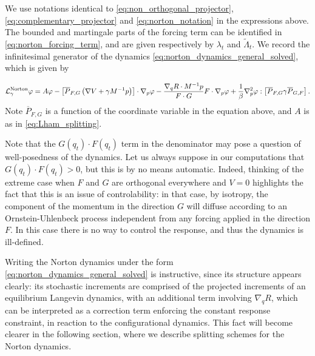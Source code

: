 We use notations identical to \eqref{eq:non_orthogonal_projector}, \eqref{eq:complementary_projector} and \eqref{eq:norton_notation} in the expressions above. The bounded and martingale parts of the forcing term can be identified in \eqref{eq:norton_forcing_term}, and are given respectively by $\lambda_t$ and $\widetilde{\Lambda}_t$. 
We record the infinitesimal generator of the dynamics \eqref{eq:norton_dynamics_general_solved}, which is given by

\begin{equation}
    \label{eq:norton_general_generator}
    \mathcal{L}_{\gamma}^{\mathrm{Norton}}\varphi = A \varphi - \left[\overline{P}_{F,G}\left(\nabla V+\gamma M^{-1}p\right)\right] \cdot \nabla_p\varphi - \frac{\nabla_q R \cdot M^{-1}p}{F\cdot G} F\cdot \nabla_p \varphi + \frac1\beta\nabla^2_p\varphi : \left[\overline{P}_{F,G}\gamma\overline{P}_{G,F}\right].
\end{equation}
Note $\overline{P}_{F,G}$ is a function of the coordinate variable in the equation above, and $A$ is as in \eqref{eq:Lham_splitting}.
\begin{remark}
    \label{rem:norton_sv_well_posedness}
    Note that the $G(q_t)\cdot F(q_t)$ term in the denominator may pose a question of well-posedness of the dynamics. Let us always suppose in our computations that $G(q_t)\cdot F(q_t)>0$, but this is by no means automatic.
    Indeed, thinking of the extreme case when $F$ and $G$ are orthogonal everywhere and $V=0$ highlights the fact that this is an issue of controlability: in that case, by isotropy, the component of the momentum in the direction $G$ will diffuse according to an Ornstein-Uhlenbeck process independent from any forcing applied in the direction $F$. In this case there is no way to control the response, and thus the dynamics is ill-defined. 
\end{remark}

Writing the Norton dynamics under the form \eqref{eq:norton_dynamics_general_solved} is instructive, since its structure appears clearly: its stochastic increments are comprised of the projected increments of an equilibrium Langevin dynamics, 
with an additional term involving $\nabla_q R$, which can be interpreted as a correction term enforcing the constant response constraint, in reaction to the configurational dynamics.
This fact will become clearer in the following section, where we describe splitting schemes for the Norton dynamics.

